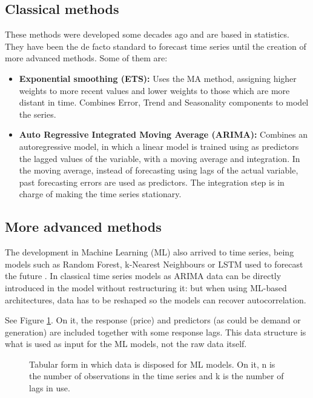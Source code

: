 \subsection{Classical methods}
These methods were developed some decades ago and are based in statistics. They have been the de facto standard to forecast time series until the creation of more advanced methods. Some of them are: \cite{lazzeri2020machine, hyndman2018forecasting}
\begin{itemize}
    \item \textbf{Exponential smoothing (ETS):} Uses the MA method, assigning higher weights to more recent values and lower weights to those which are more distant in time. Combines Error, Trend and Seasonality components to model the series.
    \item \textbf{Auto Regressive Integrated Moving Average (ARIMA):} Combines an autoregressive model, in which a linear model is trained using as predictors the lagged values of the variable, with a moving average and integration. In the moving average, instead of forecasting using lags of the actual variable, past forecasting errors are used as predictors. The integration step is in charge of making the time series stationary.
\end{itemize}

\subsection{More advanced methods}
The development in Machine Learning (ML) also arrived to time series, being models such as Random Forest, k-Nearest Neighbours or LSTM used to forecast the future \cite{lazzeri2020machine}.
In classical time series models as ARIMA data can be directly introduced in the model without restructuring it: but when using ML-based architectures, data has to be reshaped so the models can recover autocorrelation.

See Figure \ref{fig:ml-arrangement}.
On it, the response (price) and predictors (as could be demand or generation) are included together with some response lags.
This data structure is what is used as input for the ML models, not the raw data itself.

\begin{figure}[H]
\centering
    \caption{Tabular form in which data is disposed for ML models. On it, n is the number of observations in the time series and k is the number of lags in use.}
    \label{fig:ml-arrangement}
\end{figure}

